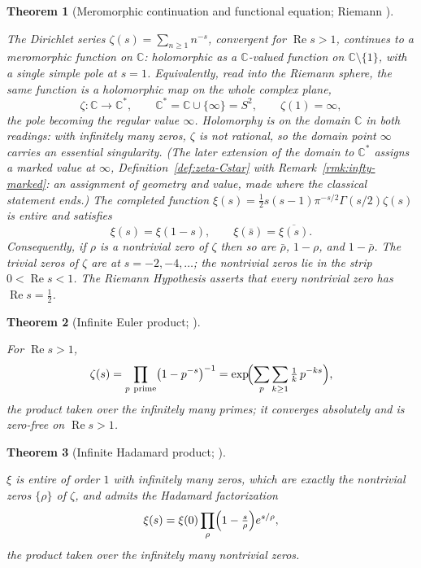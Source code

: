 \documentclass[11pt]{article}
\newcommand{\CC}{\mathbb{C}}
\newcommand{\Cstar}{\CC^{*}}
\DeclareMathOperator{\re}{Re}
\providecommand{\lean}[1]{}
\theoremstyle{plain}
\newtheorem{theorem}{Theorem}[section]
\theoremstyle{definition}
\theoremstyle{remark}
\begin{document}
\begin{theorem}[Meromorphic continuation and functional equation; Riemann \cite{Riemann1859}]\label{thm:riemann}
\lean{riemannZeta_meromorphicOn, riemannZeta_orderAt_one,
riemannZeta_conj, riemannZeta_one_sub_zero, nontrivialZero_re_mem_Ioo}
The Dirichlet series $\zeta(s)=\sum_{n\ge1}n^{-s}$, convergent for $\re s>1$, continues to a
meromorphic function on $\CC$: holomorphic as a $\CC$-valued function on
$\CC\setminus\{1\}$, with a single simple pole at $s=1$. Equivalently, read into the Riemann
sphere, the same function is a holomorphic map on the whole complex plane,
\[
  \zeta:\CC\longrightarrow\Cstar,\qquad \Cstar=\CC\cup\{\infty\}=S^2,\qquad \zeta(1)=\infty ,
\]
the pole becoming the regular value $\infty$. Holomorphy is on the domain $\CC$ in both
readings: with infinitely many zeros, $\zeta$ is not rational, so the domain point $\infty$
carries an essential singularity. (The later extension
of the \emph{domain} to $\Cstar$ assigns a marked value at $\infty$,
Definition~\ref{def:zeta-Cstar} with Remark~\ref{rmk:infty-marked}: an assignment of geometry
and value, made where the classical statement ends.)
The completed function $\xi(s)=\tfrac12 s(s-1)\pi^{-s/2}\Gamma(s/2)\zeta(s)$ is entire and satisfies
\[
  \xi(s)=\xi(1-s),\qquad \xi(\bar s)=\overline{\xi(s)} .
\]
Consequently, if $\rho$ is a nontrivial zero of $\zeta$ then so are $\bar\rho$, $1-\rho$, and
$1-\bar\rho$. The trivial zeros of $\zeta$ are at $s=-2,-4,\dots$; the nontrivial zeros lie in the
strip $0<\re s<1$. The Riemann Hypothesis asserts that every nontrivial zero has $\re s=\tfrac12$.
\end{theorem}

\begin{theorem}[Infinite Euler product; {\cite[Ch.~1]{Titchmarsh86}}]\label{thm:euler}
\lean{zetaEulerLog, zetaC2_summable, zetaC2_zero_free, zetaC2_euler}
For $\re s>1$,
\[
  \zeta(s)=\prod_{p\ \mathrm{prime}}\bigl(1-p^{-s}\bigr)^{-1}
         =\exp\!\Bigl(\sum_{p}\sum_{k\ge1}\tfrac1k\,p^{-ks}\Bigr),
\]
the product taken over the infinitely many primes; it converges absolutely and is zero-free on
$\re s>1$.
\end{theorem}

\begin{theorem}[Infinite Hadamard product; {\cite[Ch.~2]{Titchmarsh86}}]\label{thm:hadamard}
\lean{xi_entire, xi_zeros_eq_nontrivialZeros, zeta_hadamard,
riemannZeta_nontrivialZeros_infinite}
$\xi$ is entire of order $1$ with infinitely many zeros, which are exactly the nontrivial zeros
$\{\rho\}$ of $\zeta$, and admits the Hadamard factorization
\[
  \xi(s)=\xi(0)\prod_{\rho}\Bigl(1-\tfrac{s}{\rho}\Bigr)e^{s/\rho},
\]
the product taken over the infinitely many nontrivial zeros.
\end{theorem}
\end{document}
